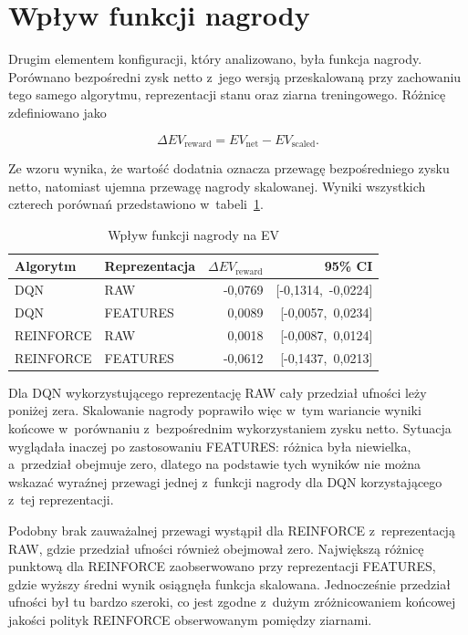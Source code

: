 \section{Wpływ funkcji nagrody}
\label{sec:wyniki-funkcja-nagrody}

Drugim elementem konfiguracji, który analizowano, była funkcja nagrody. Porównano bezpośredni
zysk netto z~jego wersją przeskalowaną przy zachowaniu tego samego
algorytmu, reprezentacji stanu oraz ziarna treningowego. Różnicę
zdefiniowano jako

\begin{equation}
    \Delta EV_{\mathrm{reward}}
    =
    EV_{\mathrm{net}}
    -
    EV_{\mathrm{scaled}}.
\end{equation}

Ze wzoru wynika, że wartość dodatnia oznacza przewagę bezpośredniego zysku netto,
natomiast ujemna przewagę nagrody skalowanej. Wyniki wszystkich
czterech porównań przedstawiono w~tabeli~\ref{tab:reward-effect}.

\begin{table}[htbp]
    \centering
    \caption{Wpływ funkcji nagrody na EV}
    \label{tab:reward-effect}
    \begin{tabular}{llrr}
        \toprule
        Algorytm & Reprezentacja & $\Delta EV_{\mathrm{reward}}$ & 95\% CI \\
        \midrule
        DQN & RAW
            & -0{,}0769 & [-0{,}1314,\ -0{,}0224] \\
        DQN & FEATURES
            & 0{,}0089 & [-0{,}0057,\ 0{,}0234] \\
        \midrule
        REINFORCE & RAW
            & 0{,}0018 & [-0{,}0087,\ 0{,}0124] \\
        REINFORCE & FEATURES
            & -0{,}0612 & [-0{,}1437,\ 0{,}0213] \\
        \bottomrule
    \end{tabular}
\end{table}

Dla DQN wykorzystującego reprezentację RAW cały przedział ufności leży
poniżej zera. Skalowanie nagrody poprawiło więc w~tym wariancie
wyniki końcowe w~porównaniu z~bezpośrednim wykorzystaniem
zysku netto. Sytuacja wyglądała inaczej po zastosowaniu FEATURES: różnica
była niewielka, a~przedział obejmuje zero, dlatego na
podstawie tych wyników nie można wskazać wyraźnej przewagi jednej
z~funkcji nagrody dla DQN korzystającego z~tej reprezentacji.

Podobny brak zauważalnej przewagi wystąpił dla REINFORCE
z~reprezentacją RAW, gdzie przedział ufności również obejmował zero.
Największą różnicę punktową dla REINFORCE zaobserwowano przy
reprezentacji FEATURES, gdzie wyższy średni wynik osiągnęła funkcja
skalowana. Jednocześnie przedział ufności był tu bardzo szeroki, co jest zgodne
z~dużym zróżnicowaniem końcowej jakości polityk REINFORCE
obserwowanym pomiędzy ziarnami.

